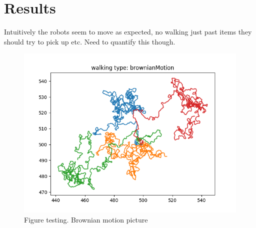 \section{Results}
Intuitively the robots seem to move as expected, no walking just past items they should try to pick up etc. Need to quantify this though. 


\begin{figure}
    \centering
    \includegraphics[width=\columnwidth]{figures/brownianMotion.png}
    \caption{Figure testing. Brownian motion picture}
    \label{fig:my_label}
\end{figure}